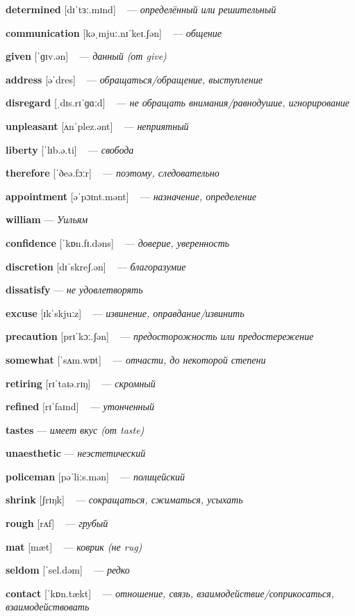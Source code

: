 \documentclass[a4paper,oneside,12pt]{amsart}
\begin{document}
{\large 

 {\bf determined } [dɪˈtɜː.mɪnd] ~ --- \emph{ определённый или решительный }

{\bf communication } [kəˌmjuː.nɪˈkeɪ.ʃən] ~ --- \emph{ общение }

{\bf given } [ˈɡɪv.ən] ~ --- \emph{ данный (от give) }

{\bf address } [əˈdres] ~ --- \emph{ обращаться/обращение, выступление }

{\bf disregard } [ˌdɪs.rɪˈɡɑːd] ~ --- \emph{ не обращать внимания/равнодушие, игнорирование }

{\bf unpleasant } [ʌnˈplez.ənt] ~ --- \emph{ неприятный }

{\bf liberty } [ˈlɪb.ə.ti] ~ --- \emph{ свобода }

{\bf therefore } [ˈðeə.fɔːr] ~ --- \emph{ поэтому, следовательно }

{\bf appointment } [əˈpɔɪnt.mənt] ~ --- \emph{ назначение, определение }

{\bf william } --- \emph{ Уильям }

{\bf confidence } [ˈkɒn.fɪ.dəns] ~ --- \emph{ доверие, уверенность }

{\bf discretion } [dɪˈskreʃ.ən] ~ --- \emph{ благоразумие }

{\bf dissatisfy } --- \emph{ не удовлетворять }

{\bf excuse } [ɪkˈskjuːz] ~ --- \emph{ извинение, оправдание/извинить }

{\bf precaution } [prɪˈkɔː.ʃən] ~ --- \emph{ предосторожность или предостережение }

{\bf somewhat } [ˈsʌm.wɒt] ~ --- \emph{ отчасти, до некоторой степени }

{\bf retiring } [rɪˈtaɪə.rɪŋ] ~ --- \emph{ скромный }

{\bf refined } [rɪˈfaɪnd] ~ --- \emph{ утонченный }

{\bf tastes } --- \emph{ имеет вкус (от taste) }

{\bf unaesthetic } --- \emph{ неэстетический }

{\bf policeman } [pəˈliːs.mən] ~ --- \emph{ полицейский }

{\bf shrink } [ʃrɪŋk] ~ --- \emph{ сокращаться, сжиматься, усыхать }

{\bf rough } [rʌf] ~ --- \emph{ грубый }

{\bf mat } [mæt] ~ --- \emph{ коврик (не rug) }

{\bf seldom } [ˈsel.dəm] ~ --- \emph{ редко }

{\bf contact } [ˈkɒn.tækt] ~ --- \emph{ отношение, связь, взаимодействие/соприкосаться, взаимодействовать }

}
\end{document}
